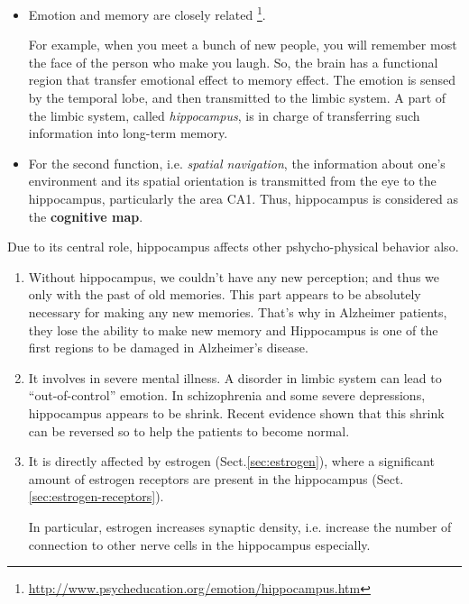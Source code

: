 \begin{itemize}

  \item  Emotion and memory are closely
  related
  \footnote{\url{http://www.psycheducation.org/emotion/hippocampus.htm}}.

For example, when you meet a bunch of new people, you will remember most the
face of the person who make you laugh. So, the brain has a functional region
that transfer emotional effect to memory effect. The emotion is sensed by the
temporal lobe, and then transmitted to the limbic system. A part of the limbic
system, called {\it hippocampus}, is in charge of transferring such information
into long-term memory.

  \item For the second function, i.e. {\it spatial navigation}, the
information about one's environment and its spatial orientation is
transmitted from the eye to the hippocampus, particularly the area
CA1. Thus, hippocampus is considered as the {\bf cognitive map}.
\end{itemize}

Due to its central role, hippocampus affects other pshycho-physical
behavior also. 
\begin{enumerate}

\item Without hippocampus, we couldn't have any new perception; and
  thus we only with the past of old memories. This part appears to be
  absolutely necessary for making any new memories. That's why in
  Alzheimer patients, they lose the ability to make new memory and
  Hippocampus is one of the first regions to be damaged in Alzheimer's
  disease.

\item It involves in severe mental illness.  A disorder in limbic
  system can lead to ``out-of-control'' emotion. In schizophrenia and
  some severe depressions, hippocampus appears to be shrink. Recent
  evidence shown that this shrink can be reversed so to help the
  patients to become normal.

\item It is directly affected by estrogen (Sect.\ref{sec:estrogen}), where a
significant amount of estrogen receptors are present in the hippocampus
(Sect.\ref{sec:estrogen-receptors}).

In particular, estrogen increases synaptic density, i.e. increase the number of
connection to other nerve cells in the hippocampus  especially.

\end{enumerate}

